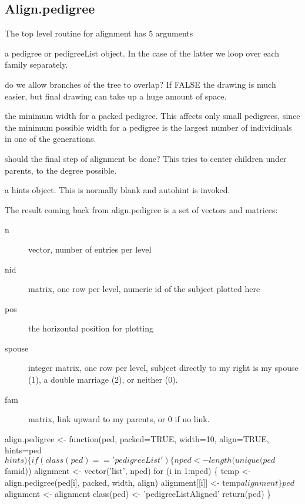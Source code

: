 \documentclass{article}
\begin{document}
\begin{enumerate}
\subsection{Align.pedigree}
\label{sect:alignped}
The top level routine for alignment has 5 arguments
\begin{description}
    \item[ped] a pedigree or pedigreeList object. In the case of
      the latter we loop over each family separately.
    \item[packed] do we allow branches of the tree to overlap?  
      If FALSE the drawing is much easier, but final drawing can
      take up a huge amount of space.  
    \item[width] the minimum width for a packed pedigree. This
      affects only small pedigrees, since the minimum possible
      width for a pedigree is the largest number of individiuals in
      one of the generations.
    \item[align] should the final step of alignment be done?  This
      tries to center children under parents, to the degree possible.
    \item a hints object.  This is normally blank and autohint
      is invoked. 
\end{description}
The result coming back from align.pedigree is a set of vectors and
matrices:
\begin{description}
  \item[n] vector, number of entries per level
  \item[nid] matrix, one row per level, numeric id of the subject plotted
    here
  \item[pos] the horizontal position for plotting
  \item[spouse] integer matrix, one row per level, subject directly to my
    right is my spouse (1), a double marriage (2), or neither (0).
  \item[fam] matrix, link upward to my parents, or 0 if no link.
\end{description}
\nwenddocs{}\endmoddef
align.pedigree <- function(ped, packed=TRUE, width=10,
                           align=TRUE, hints=ped$hints) \{
    if (class(ped)== 'pedigreeList') \{
        nped <- length(unique(ped$famid))
        alignment <- vector('list', nped)
        for (i in 1:nped) \{
            temp <- align.pedigree(ped[i], packed, width, align)
            alignment[[i]] <- temp$alignment
            \}
        ped$alignment <- alignment
        class(ped) <- 'pedigreeListAligned'
        return(ped)
        \}
    

\end{enumerate}
\end{document}
